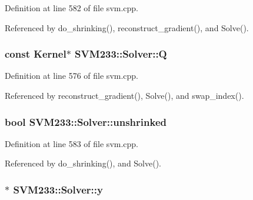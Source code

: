 Definition at line 582 of file svm.\+cpp.



Referenced by do\+\_\+shrinking(), reconstruct\+\_\+gradient(), and Solve().

\subsubsection[{\texorpdfstring{Q}{Q}}]{\setlength{\rightskip}{0pt plus 5cm}const {\bf Kernel}$\ast$ S\+V\+M233\+::\+Solver\+::Q\hspace{0.3cm}{\ttfamily [protected]}}\hypertarget{class_s_v_m233_1_1_solver_a09e21006f46841e5c9c6f97b87995743}{}\label{class_s_v_m233_1_1_solver_a09e21006f46841e5c9c6f97b87995743}


Definition at line 576 of file svm.\+cpp.



Referenced by reconstruct\+\_\+gradient(), Solve(), and swap\+\_\+index().

\subsubsection[{\texorpdfstring{unshrinked}{unshrinked}}]{\setlength{\rightskip}{0pt plus 5cm}bool S\+V\+M233\+::\+Solver\+::unshrinked\hspace{0.3cm}{\ttfamily [protected]}}\hypertarget{class_s_v_m233_1_1_solver_a5cf7673b38cdd6d71056e904ec1cb6b9}{}\label{class_s_v_m233_1_1_solver_a5cf7673b38cdd6d71056e904ec1cb6b9}


Definition at line 583 of file svm.\+cpp.



Referenced by do\+\_\+shrinking(), and Solve().

\subsubsection[{\texorpdfstring{y}{y}}]{$\ast$ S\+V\+M233\+::\+Solver\+::y\hspace{0.3cm}{\ttfamily [protected]}}\hypertarget{class_s_v_m233_1_1_solver_a17e4f05ccc46afc5b9bf686eac10928d}{}\label{class_s_v_m233_1_1_solver_a17e4f05ccc46afc5b9bf686eac10928d}


